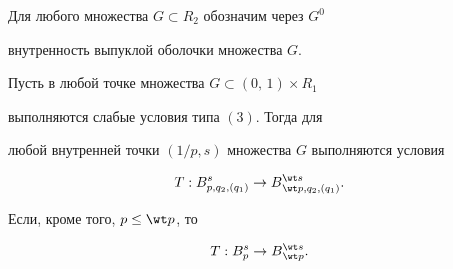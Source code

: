 Для любого множества $G\subset R_2$ обозначим через $G^0$


внутренность выпуклой оболочки множества $G$.





\begin{thm}


Пусть в любой точке множества $G\subset(0,\,1)\times R_1$


выполняются слабые условия типа $(3)$. Тогда для


любой внутренней точки $(1/p,s)$ множества $G$ выполняются условия


$$


T:B^s_{p,q_2,(q_1)} \rightarrow B{}^{\wt s}_{\wt p,q_2,(q_1)}.


$$


Если, кроме того, $p\le \wt p$, то


$$


T:B^s_p\rightarrow B{}^{\wt s}_{\wt p}.


$$


\end{thm}





